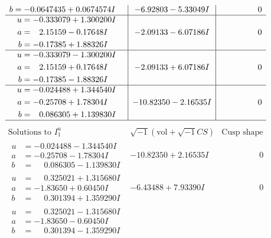 \documentclass[1p]{elsarticle_modified}
\theoremstyle{definition}
\newcommand{\I}{\sqrt{-1}}
\begin{document}
$$\begin{array}{c|c|c}
\begin{aligned}
b &= -0.0647435 + 0.0674574 I\end{aligned}
 & -6.92803 - 5.33049 I & \phantom{-0.000000 } 0 \\ \hline\begin{aligned}
u &= -0.333079 + 1.300200 I \\
a &= \phantom{-}2.15159 - 0.17648 I \\
b &= -0.17385 + 1.88326 I\end{aligned}
 & -2.09133 - 6.07186 I & \phantom{-0.000000 } 0 \\ \hline\begin{aligned}
u &= -0.333079 - 1.300200 I \\
a &= \phantom{-}2.15159 + 0.17648 I \\
b &= -0.17385 - 1.88326 I\end{aligned}
 & -2.09133 + 6.07186 I & \phantom{-0.000000 } 0 \\ \hline\begin{aligned}
u &= -0.024488 + 1.344540 I \\
a &= -0.25708 + 1.78304 I \\
b &= \phantom{-}0.086305 + 1.139830 I\end{aligned}
 & -10.82350 - 2.16535 I & \phantom{-0.000000 } 0\\
 \hline 
 \end{array}$$\newpage$$\begin{array}{c|c|c}  
\text{Solutions to }I^u_{1}& \I (\text{vol} + \sqrt{-1}CS) & \text{Cusp shape}\\
 \hline 
\begin{aligned}
u &= -0.024488 - 1.344540 I \\
a &= -0.25708 - 1.78304 I \\
b &= \phantom{-}0.086305 - 1.139830 I\end{aligned}
 & -10.82350 + 2.16535 I & \phantom{-0.000000 } 0 \\ \hline\begin{aligned}
u &= \phantom{-}0.325021 + 1.315680 I \\
a &= -1.83650 + 0.60450 I \\
b &= \phantom{-}0.301394 + 1.359290 I\end{aligned}
 & -6.43488 + 7.93390 I & \phantom{-0.000000 } 0 \\ \hline\begin{aligned}
u &= \phantom{-}0.325021 - 1.315680 I \\
a &= -1.83650 - 0.60450 I \\
b &= \phantom{-}0.301394 - 1.359290 I\end{aligned}

\end{array}$$
\end{document}
